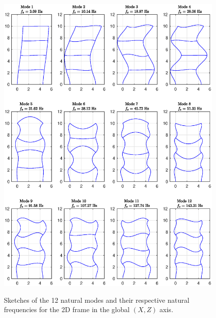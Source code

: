 \documentclass[11pt,a4paper,titlepage]{report}
\begin{document}
\begin{figure}
    \centering
    \includegraphics[width=16cm]{Mode_Shapes_X.eps}
\label{fig: I.1 - modes shapes x}
 \caption{Sketches of the 12 natural modes and their respective natural frequencies for the 2D frame in the global $(X,Z)$ axis.}
\end{figure}
\newpage
\end{document}
